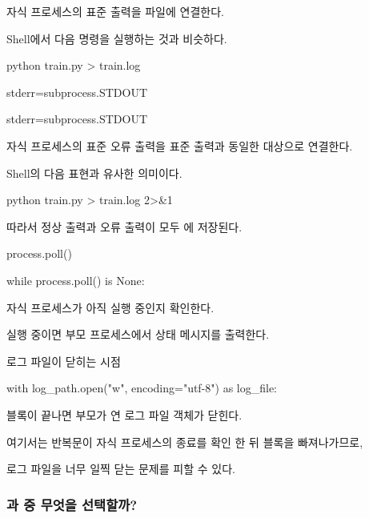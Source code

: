자식 프로세스의 표준 출력을 파일에 연결한다.

Shell에서 다음 명령을 실행하는 것과 비슷하다.

\begin{dhkzsh}
python train.py > train.log
\end{dhkzsh}

\begin{dhknote}
\begin{dhksmry}[centered]
stderr=subprocess.STDOUT
\end{dhksmry}
\end{dhknote}

\begin{dhkzsh}
stderr=subprocess.STDOUT
\end{dhkzsh}

자식 프로세스의 표준 오류 출력을 표준 출력과 동일한 대상으로 연결한다.

Shell의 다음 표현과 유사한 의미이다.

\begin{dhkzsh}
python train.py > train.log 2>&1
\end{dhkzsh}

따라서 정상 출력과 오류 출력이 모두 에 저장된다.

\begin{dhknote}
\begin{dhksmry}[centered]
process.poll()
\end{dhksmry}
\end{dhknote}

\begin{dhkcode}
while process.poll() is None:
\end{dhkcode}

자식 프로세스가 아직 실행 중인지 확인한다.

실행 중이면 부모 프로세스에서 상태 메시지를 출력한다.

로그 파일이 닫히는 시점

\begin{dhkcode}
with log_path.open("w", encoding="utf-8") as log_file:
\end{dhkcode}

 블록이 끝나면 부모가 연 로그 파일 객체가 닫힌다.

여기서는 반복문이 자식 프로세스의 종료를 확인 한 뒤  블록을 빠져나가므로,

로그 파일을 너무 일찍 닫는 문제를 피할 수 있다.

\subsubsection{과  중 무엇을 선택할까?}

